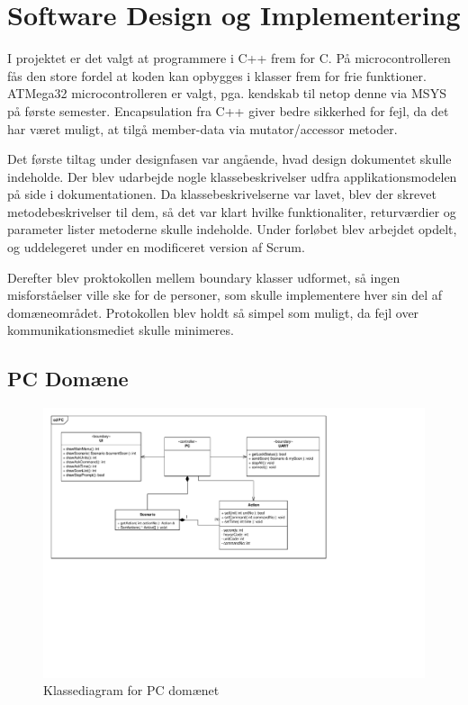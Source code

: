 \section{Software Design og Implementering}

I projektet er det valgt at programmere i C++ frem for C. På microcontrolleren fås den store fordel at koden kan opbygges i klasser frem for frie funktioner. ATMega32 microcontrolleren er valgt, pga. kendskab til netop denne via MSYS på første semester. Encapsulation fra C++ giver bedre sikkerhed for fejl, da det har været muligt, at tilgå member-data via mutator/accessor metoder. 

Det første tiltag under designfasen var angående, hvad design dokumentet skulle indeholde. Der blev udarbejde nogle klassebeskrivelser udfra applikationsmodelen på side \pageref{P-fig:PC_klasse} i dokumentationen. Da klassebeskrivelserne var lavet, blev der skrevet metodebeskrivelser til dem, så det var klart hvilke funktionaliter, returværdier og parameter lister metoderne skulle indeholde.
Under forløbet blev arbejdet opdelt, og uddelegeret under en modificeret version af Scrum.

Derefter blev proktokollen mellem boundary klasser udformet, så ingen misforståelser ville ske for de personer, som skulle implementere hver sin del af domæneområdet. Protokollen blev holdt så simpel som muligt, da fejl over kommunikationsmediet skulle minimeres.

\subsection{PC Domæne}

\begin{figure}[h]
	\centering 
	\includegraphics[width=\textwidth,trim=17 260 200 15, clip=true]{Projektbeskrivelse/Design_SW/diagrammer/PC_KlasseDiagram.pdf}
	\caption{Klassediagram for PC domænet}
\end{figure}

